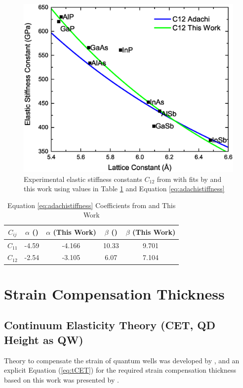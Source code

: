 \documentclass{article}
\begin{document}
\begin{figure}
	\includegraphics[width=0.85\linewidth]{C12}
	\centering
	\caption{Experimental elastic stiffness constants \(C_{12}\) from \cite{vurgaftman_band_2001} with fits by \cite{adachi_properties_2005} and this work using values in Table \ref{table:stiffnesscalccoeff} and Equation \ref{eq:adachistiffness}}
	\label{fig:C12}
\end{figure}

\begin{table}
	\caption{Equation \ref{eq:adachistiffness} Coefficients from \citeauthor{adachi_properties_2005} \cite{adachi_properties_2005} and This Work} 
	\centering
	\begin{tabular}{c c c c c} 
		\hline\hline 
		$C_{ij}$ & \(\alpha\) (\citeauthor{adachi_properties_2005}) & \(\alpha\) (This Work) & \(\beta\) (\citeauthor{adachi_properties_2005}) & \(\beta\) (This Work) \\ %
		\hline %
		\(C_{11}\) & -4.59 & -4.166 & 10.33 & 9.701 \\ 
		\(C_{12}\) & -2.54 & -3.105 & 6.07 & 7.104 \\ %
		\hline
	\end{tabular}
	\label{table:stiffnesscalccoeff} %
\end{table}
\FloatBarrier
\section{Strain Compensation Thickness}
\label{straincomp}
\subsection{Continuum Elasticity Theory (CET, QD Height as QW)}
Theory to compensate the strain of quantum wells was developed by \citeauthor{ekins-daukes_strain-balanced_2002} \cite{ekins-daukes_strain-balanced_2002}, and an explicit Equation (\ref{eq:tCET}) for the required strain compensation thickness based on this work was presented by \citeauthor{bailey_evaluation_2009} \cite{bailey_evaluation_2009}.
\end{document}
